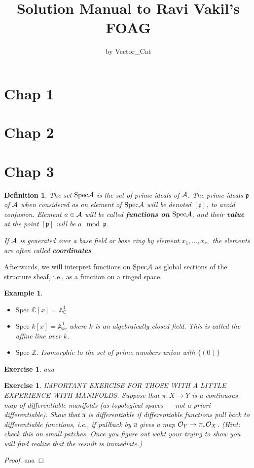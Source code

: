 \documentclass[11pt]{article}
\title{\bf Solution Manual to Ravi Vakil's FOAG}
\author{by Vector\_Cat} %
\newtheorem{dfn}[thm]{Definition}
\newtheorem{ex}[thm]{Example}
\newtheorem{exercise}[thm]{Exercise}
\newcommand{\cplx}{\mathbb C}
\newcommand{\intg}{\mathbb Z}
\newcommand{\scp}{{\mathfrak p}}
\newcommand{\cala}{{\cal A}}
\newcommand{\calo}{{\cal O}}
\newcommand{\rta}{\rightarrow}
\newcommand{\lrta}{\longrightarrow}
\begin{document}
\maketitle
\section{Chap 1}
\section{Chap 2}
\section{Chap 3}
\begin{dfn}
The set $\text{Spec}\cala$ is the set of  prime ideals of $\cala$. The prime ideals $\scp$ of $\cala$ when considered as an element of $\text{Spec}\cala$ will be denoted $[\scp]$, to avoid confusion. Element $a\in\cala$ will be called \textbf{functions on} $\text{Spec}\cala$, and their \textbf{value} at the point $[\scp]$ will be $a\mod \scp$.

If $\cala$ is generated over a base field or base ring by element $x_1,...,x_r,$ the elements are often called \textbf{coordinates}
\end{dfn}

Afterwards, we will interpret functions on $\text{Spec}\cala$ as global sections of the structure sheaf, i.e., as a function on a ringed space.
\begin{ex}\ 
\begin{itemize}
\item $\text{Spec }\cplx[x]=\mathbb{A}^1_\cplx$
\item $\text{Spec }k[x]=\mathbb{A}^1_k$, where $k$ is an algebraically closed field. This is called the affine line over $k$.
\item $\text{Spec }\intg$. Isomorphic to the set of prime numbers union with $\{(0)\}$
\end{itemize}
\end{ex}
\begin{exercise}
aaa
\end{exercise}
\begin{exercise}
 IMPORTANT EXERCISE FOR THOSE WITH A LITTLE EXPERIENCE WITH MANIFOLDS. Suppose that $\pi: X\lrta Y$ is a continuous map of differentiable manifolds (as topological spaces — not a priori differentiable). Show that π is differentiable if differentiable functions pull back to differentiable functions, i.e., if pullback by π gives a map $\calo_Y\rta \pi_*\calo_X$. (Hint: check this on small patches. Once you figure out waht your trying to show you will find realize that the resuilt is immediate.)
\end{exercise}
\begin{proof}
aaa
\end{proof}
\end{document}
